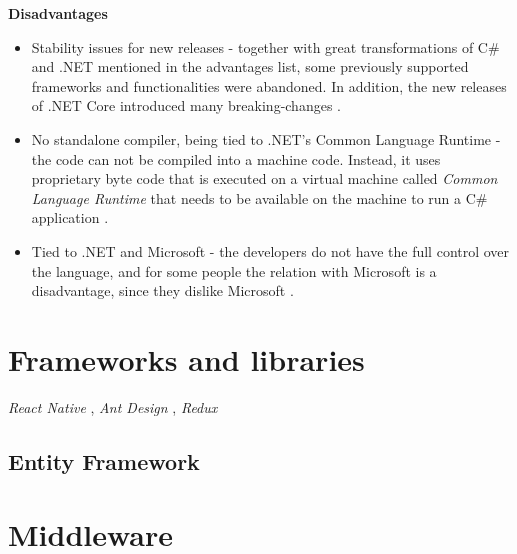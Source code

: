 \textbf{Disadvantages}
\begin{itemize}
    \item Stability issues for new releases - together with great transformations of C\# and .NET mentioned in the advantages list, some previously supported frameworks and functionalities were abandoned. In addition, the new releases of .NET Core introduced many breaking-changes \cite{net-breaking-changes}. 
    \item No standalone compiler, being tied to .NET's Common Language Runtime - the code can not be compiled into a machine code. Instead, it uses proprietary byte code that is executed on a virtual machine called \textit{Common Language Runtime} that needs to be available on the machine to run a C\# application \cite{c-sharp-tour}.
    \item Tied to .NET and Microsoft - the developers do not have the full control over the language, and for some people the relation with Microsoft is a disadvantage, since they dislike Microsoft .
\end{itemize}

\section{Frameworks and libraries}
 \textit{React Native} \cite{react_native}, \textit{Ant Design} \cite{ant_design}, \textit{Redux} \cite{redux}
 \subsection{Entity Framework}
\section{Middleware}
